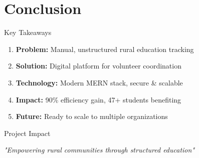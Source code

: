 \documentclass[aspectratio=169]{beamer}
\begin{document}
\section{Conclusion}

\begin{frame}{Key Takeaways}
    \begin{enumerate}
        \item \textbf{Problem:} Manual, unstructured rural education tracking
        
        \vspace{0.5em}
        
        \item \textbf{Solution:} Digital platform for volunteer coordination
        
        \vspace{0.5em}
        
        \item \textbf{Technology:} Modern MERN stack, secure \& scalable
        
        \vspace{0.5em}
        
        \item \textbf{Impact:} 90\% efficiency gain, 47+ students benefiting
        
        \vspace{0.5em}
        
        \item \textbf{Future:} Ready to scale to multiple organizations
    \end{enumerate}
\end{frame}

\begin{frame}{Project Impact}
    \begin{center}
    \end{center}
    
    \vspace{1em}
    
    \begin{center}
        \textit{"Empowering rural communities through structured education"}
    \end{center}
\end{frame}
\end{document}
